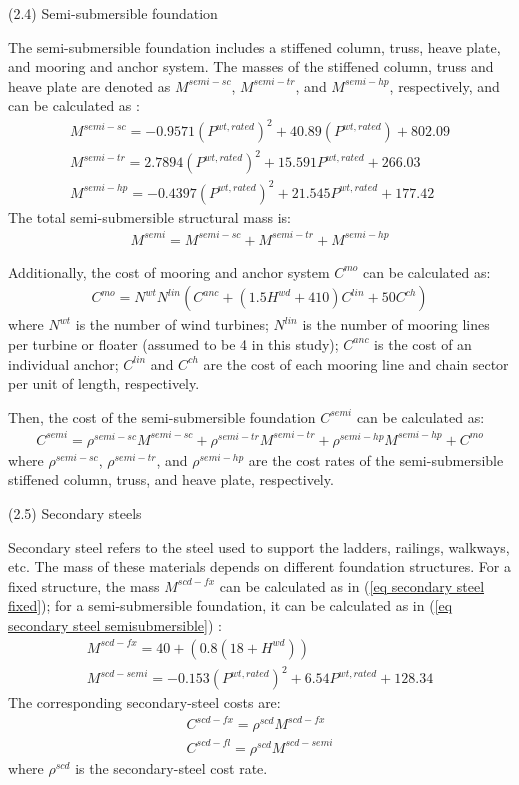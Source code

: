 \documentclass[sn-mathphys,Numbered]{sn-jnl}%
\theoremstyle{plain}%
\theoremstyle{definition}%
\theoremstyle{remark}%
\begin{document}
(2.4) Semi-submersible foundation

The semi-submersible foundation includes a stiffened column, truss, heave plate, and mooring and anchor system. The masses of the stiffened column, truss and heave plate are denoted as $M^{semi-sc}$, $M^{semi-tr}$, and $M^{semi-hp}$, respectively, and can be calculated as \cite{NRELOffshoreBalance,gonzalez2024techno}:
\begin{align}
    M^{semi-sc} = -0.9571(P^{wt,rated})^2 + 40.89(P^{wt,rated}) + 802.09
\\
    M^{semi-tr} = 2.7894 (P^{wt,rated})^2 + 15.591 P^{wt,rated} + 266.03
\\
    M^{semi-hp} = - 0.4397 (P^{wt,rated})^2 + 21.545 P^{wt,rated} + 177.42
\end{align}
The total semi-submersible structural mass is:
\begin{gather}
    M^{semi} = M^{semi-sc} + M^{semi-tr} + M^{semi-hp}
\end{gather}

Additionally, the cost of mooring and anchor system $C^{mo}$ can be calculated as:
\begin{align}
    C^{mo} = N^{wt} N^{lin} (C^{anc} + (1.5 H^{wd} + 410) C^{lin} + 50 C^{ch})
\end{align}
where $N^{wt}$ is the number of wind turbines; $N^{lin}$ is the number of mooring lines per turbine or floater (assumed to be 4 in this study); $C^{anc}$ is the cost of an individual anchor; $C^{lin}$ and $C^{ch}$ are the cost of each mooring line and chain sector per unit of length, respectively.

Then, the cost of the semi-submersible foundation $C^{semi}$ can be calculated as:
\begin{gather}
    C^{semi} = \rho^{semi-sc} M^{semi-sc} + \rho^{semi-tr} M^{semi-tr} + \rho^{semi-hp} M^{semi-hp} + C^{mo}
\end{gather}
where $\rho^{semi-sc}$, $\rho^{semi-tr}$, and $\rho^{semi-hp}$ are the cost rates of the semi-submersible stiffened column, truss, and heave plate, respectively.

(2.5) Secondary steels

Secondary steel refers to the steel used to support the ladders, railings, walkways, etc. The mass of these materials depends on different foundation structures. For a fixed structure, the mass $M^{scd-fx}$ can be calculated as in (\ref{eq secondary steel fixed}); for a semi-submersible foundation, it can be calculated as in (\ref{eq secondary steel semisubmersible}) \cite{NRELOffshoreBalance}:
\begin{gather}
    M^{scd-fx} = 40 + \left(0.8\left(18+H^{wd}\right)\right)
\label{eq secondary steel fixed} \\
    M^{scd-semi} = -0.153(P^{wt,rated})^2 + 6.54 P^{wt,rated} + 128.34
\label{eq secondary steel semisubmersible}
\end{gather}
The corresponding secondary-steel costs are:
\begin{gather}
    C^{scd-fx} = \rho^{scd} M^{scd-fx} \\
    C^{scd-fl} = \rho^{scd} M^{scd-semi}
\end{gather}
where $\rho^{scd}$ is the secondary-steel cost rate.
\end{document}
